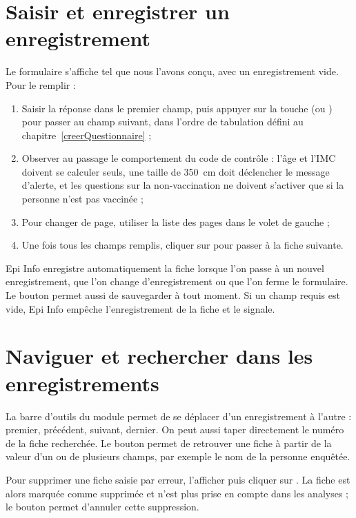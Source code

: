 \section{Saisir et enregistrer un enregistrement}

Le formulaire s'affiche tel que nous l'avons conçu, avec un enregistrement vide. Pour le remplir :

\begin{enumerate}
	\item Saisir la réponse dans le premier champ, puis appuyer sur la touche  (ou ) pour passer au champ suivant, dans l'ordre de tabulation défini au chapitre~\ref{creerQuestionnaire} ;
	\item Observer au passage le comportement du code de contrôle : l'âge et l'IMC doivent se calculer seuls, une taille de 350~cm doit déclencher le message d'alerte, et les questions sur la non-vaccination ne doivent s'activer que si la personne n'est pas vaccinée ;
	\item Pour changer de page, utiliser la liste des pages dans le volet de gauche ;
	\item Une fois tous les champs remplis, cliquer sur  pour passer à la fiche suivante.
\end{enumerate}

Epi Info enregistre automatiquement la fiche lorsque l'on passe à un nouvel enregistrement, que l'on change d'enregistrement ou que l'on ferme le formulaire. Le bouton  permet aussi de sauvegarder à tout moment. Si un champ requis est vide, Epi Info empêche l'enregistrement de la fiche et le signale.

\section{Naviguer et rechercher dans les enregistrements}

La barre d'outils du module permet de se déplacer d'un enregistrement à l'autre : premier, précédent, suivant, dernier. On peut aussi taper directement le numéro de la fiche recherchée. Le bouton  permet de retrouver une fiche à partir de la valeur d'un ou de plusieurs champs, par exemple le nom de la personne enquêtée.

Pour supprimer une fiche saisie par erreur, l'afficher puis cliquer sur . La fiche est alors marquée comme supprimée et n'est plus prise en compte dans les analyses ; le bouton  permet d'annuler cette suppression.

